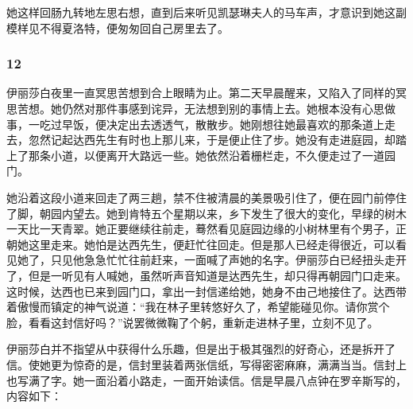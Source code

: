 \par 她这样回肠九转地左思右想，直到后来听见凯瑟琳夫人的马车声，才意识到她这副模样见不得夏洛特，便匆匆回自己房里去了。



\subsubsection*{12}


\par 伊丽莎白夜里一直冥思苦想到合上眼睛为止。第二天早晨醒来，又陷入了同样的冥思苦想。她仍然对那件事感到诧异，无法想到别的事情上去。她根本没有心思做事，一吃过早饭，便决定出去透透气，散散步。她刚想往她最喜欢的那条道上走去，忽然记起达西先生有时也上那儿来，于是便止住了步。她没有走进庭园，却踏上了那条小道，以便离开大路远一些。她依然沿着栅栏走，不久便走过了一道园门。
\par 她沿着这段小道来回走了两三趟，禁不住被清晨的美景吸引住了，便在园门前停住了脚，朝园内望去。她到肯特五个星期以来，乡下发生了很大的变化，早绿的树木一天比一天青翠。她正要继续往前走，蓦然看见庭园边缘的小树林里有个男子，正朝她这里走来。她怕是达西先生，便赶忙往回走。但是那人已经走得很近，可以看见她了，只见他急急忙忙往前赶来，一面喊了声她的名字。伊丽莎白已经扭头走开了，但是一听见有人喊她，虽然听声音知道是达西先生，却只得再朝园门口走来。这时候，达西也已来到园门口，拿出一封信递给她，她身不由己地接住了。达西带着傲慢而镇定的神气说道：“我在林子里转悠好久了，希望能碰见你。请你赏个脸，看看这封信好吗？”说罢微微鞠了个躬，重新走进林子里，立刻不见了。
\par 伊丽莎白并不指望从中获得什么乐趣，但是出于极其强烈的好奇心，还是拆开了信。使她更为惊奇的是，信封里装着两张信纸，写得密密麻麻，满满当当。信封上也写满了字。她一面沿着小路走，一面开始读信。信是早晨八点钟在罗辛斯写的，内容如下：
